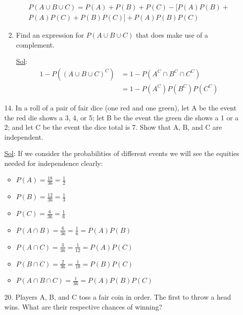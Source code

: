 \begin{enumerate}
\begin{enumerate}
\begin{center}
        \end{center}
        \[
          \begin{aligned}
            P(A \cup B \cup C) = P(A) + P(B) + P(C) - [P(A)P(B) + \\
            P(A)P(C) + P(B)P(C)] + P(A)P(B)P(C)
          \end{aligned}
        \]
      \item Find an expression for \(P(A \cup B \cup C)\) that does
        make use of a complement.

        \underline{Sol}:
        \[
          \begin{aligned}
            1 - P((A \cup B \cup C)^C) &= 1 - P(A^C \cap B^C \cap C^C) \\
            &= 1 - P(A^C) P(B^C) P(C^C)
          \end{aligned}
        \]
    \end{enumerate}

  \item[14.] In a roll of a pair of fair dice (one red and one
    green), let A be the event the red die shows a 3, 4, or 5; let B
    be the event the green die shows a 1 or a 2; and let C be the
    event the dice total is 7. Show that A, B, and C are independent.

    \underline{Sol}: If we consider the probabilities of different
    events we will see the equities needed for independence clearly:

    \begin{itemize}
      \item \(P(A) = \frac{18}{36} = \frac{1}{2}\)
      \item \(P(B) = \frac{12}{36} = \frac{1}{3}\)
      \item \(P(C) = \frac{6}{36} = \frac{1}{6}\)
      \item \(P(A \cap B) = \frac{6}{36} = \frac{1}{6} = P(A) P(B)\)
      \item \(P(A \cap C) = \frac{3}{36} = \frac{1}{12} = P(A) P(C)\)
      \item \(P(B \cap C) = \frac{2}{36} = \frac{1}{18} = P(B) P(C)\)
      \item \(P(A \cap B \cap C) = \frac{1}{36} = P(A) P(B) P(C)\)
    \end{itemize}

  \item[20.] Players A, B, and C toss a fair coin in order. The first
    to throw a head wins. What are their respective chances of winning?


\end{enumerate}
